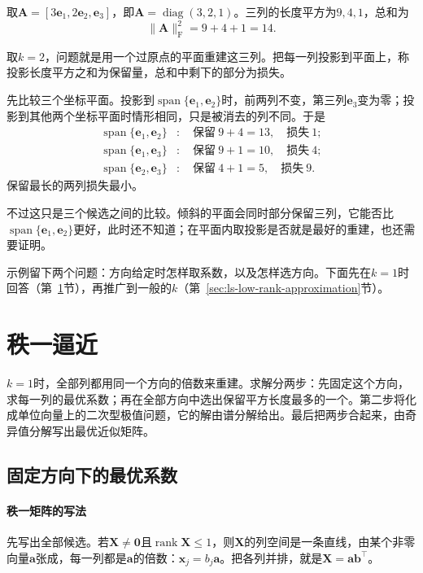 \begin{example}[三个坐标向量的重建]
\label{ex:ls-low-rank-three-columns}
取$\bm A=[3\bm e_1,2\bm e_2,\bm e_3]$，即$\bm A=\operatorname{diag}(3,2,1)$。三列的长度平方为$9,4,1$，总和为
\[
 \lVert\bm A\rVert_{\mathrm F}^2=9+4+1=14 .
\]

取$k=2$，问题就是用一个过原点的平面重建这三列。把每一列投影到平面上，称投影长度平方之和为保留量，总和中剩下的部分为损失。

先比较三个坐标平面。投影到$\operatorname{span}\{\bm e_1,\bm e_2\}$时，前两列不变，第三列$\bm e_3$变为零；投影到其他两个坐标平面时情形相同，只是被消去的列不同。于是
\[
 \begin{aligned}
 \operatorname{span}\{\bm e_1,\bm e_2\}&:\quad\text{保留}\ 9+4=13,\quad\text{损失}\ 1;\\
 \operatorname{span}\{\bm e_1,\bm e_3\}&:\quad\text{保留}\ 9+1=10,\quad\text{损失}\ 4;\\
 \operatorname{span}\{\bm e_2,\bm e_3\}&:\quad\text{保留}\ 4+1=5,\quad\text{损失}\ 9.
 \end{aligned}
\]
保留最长的两列损失最小。

不过这只是三个候选之间的比较。倾斜的平面会同时部分保留三列，它能否比$\operatorname{span}\{\bm e_1,\bm e_2\}$更好，此时还不知道；在平面内取投影是否就是最好的重建，也还需要证明。
\end{example}

示例留下两个问题：方向给定时怎样取系数，以及怎样选方向。下面先在$k=1$时回答（第~\ref{sec:ls-rank-one-rayleigh}节），再推广到一般的$k$（第~\ref{sec:ls-low-rank-approximation}节）。

\section{秩一逼近}
\label{sec:ls-rank-one-rayleigh}

$k=1$时，全部列都用同一个方向的倍数来重建。求解分两步：先固定这个方向，求每一列的最优系数；再在全部方向中选出保留平方长度最多的一个。第二步将化成单位向量上的二次型极值问题，它的解由谱分解给出。最后把两步合起来，由奇异值分解写出最优近似矩阵。

\subsection{固定方向下的最优系数}
\label{sec:matrix-approximation-rank-one-coefficients}

\paragraph{秩一矩阵的写法}
先写出全部候选。若$\bm X\neq\bm0$且$\operatorname{rank}\bm X\leq1$，则$\bm X$的列空间是一条直线，由某个非零向量$\bm a$张成，每一列都是$\bm a$的倍数：$\bm x_j=b_j\bm a$。把各列并排，就是$\bm X=\bm a\bm b^\top$。

